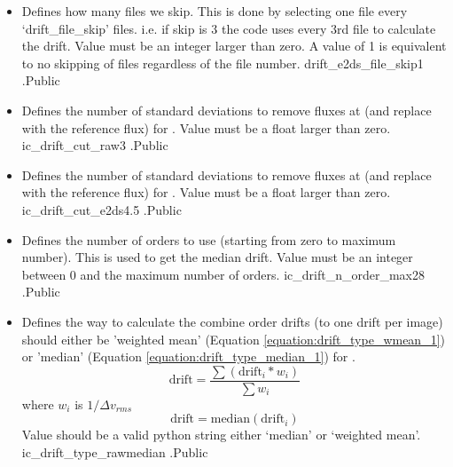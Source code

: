 \begin{itemize}
\item {}
{Defines how many files we skip. This is done by selecting one file every `drift\_file\_skip' files. i.e. if skip is 3 the code uses every 3rd file to calculate the drift. Value must be an integer larger than zero. A value of 1 is equivalent to no skipping of files regardless of the file number.}
{drift\_e2ds\_file\_skip}{1}
{\calDRIFTE}{\constantsfile}{\calDRIFTE.\progMAIN}{Public}


\item {}
{Defines the number of standard deviations to remove fluxes at (and replace with the reference flux) for \calDRIFTRAW. Value must be a float larger than zero.}
{ic\_drift\_cut\_raw}{3}
{\calDRIFTRAW}{\constantsfile}{\calDRIFTRAW.\progMAIN}{Public}


\item {}
{Defines the number of standard deviations to remove fluxes at (and replace with the reference flux) for \calDRIFTE. Value must be a float larger than zero.}
{ic\_drift\_cut\_e2ds}{4.5}
{\calDRIFTE}{\constantsfile}{\calDRIFTE.\progMAIN}{Public}


\item {}
{Defines the number of orders to use (starting from zero to maximum number). This is used to get the median drift. Value must be an integer between 0 and the maximum number of orders.}
{ic\_drift\_n\_order\_max}{28}
{\calDRIFTRAW}{\constantsfile}{\calDRIFTRAW.\progMAIN}{Public}


\item {}
{Defines the way to calculate the combine order drifts (to one drift per image) should either be 'weighted mean' (Equation \ref{equation:drift_type_wmean_1}) or 'median' (Equation \ref{equation:drift_type_median_1}) for \calDRIFTRAW.
\begin{equation}
\label{equation:drift_type_wmean_1}
\text{drift} = \frac{\sum{(\text{drift}_i * w_i)}}{\sum{w_i}}
\end{equation}
\noindent where $w_i$ is $1/\Delta v_{rms}$
\begin{equation}
\label{equation:drift_type_median_1}
\text{drift} = \text{median}(\text{drift}_i)
\end{equation}
\noindent Value should be a valid python string either `median' or `weighted mean'.
}
{ic\_drift\_type\_raw}{median}
{\calDRIFTRAW}{\constantsfile}{\calDRIFTRAW.\progMAIN}{Public}



\end{itemize}

